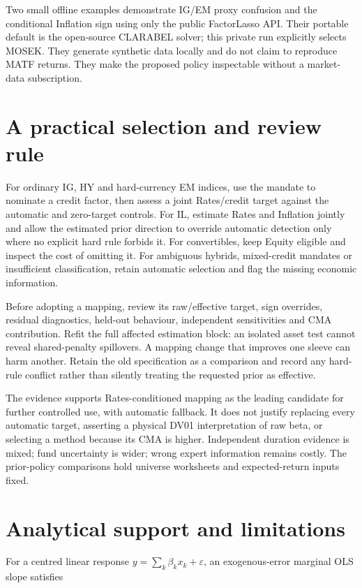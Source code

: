 \documentclass[a4paper,review]{cas-sc}
\begin{document}
Two small offline examples demonstrate IG/EM proxy confusion and the conditional Inflation sign using only the public FactorLasso API. Their portable default is the open-source CLARABEL solver; this private run explicitly selects MOSEK. They generate synthetic data locally and do not claim to reproduce MATF returns. They make the proposed policy inspectable without a market-data subscription.

\section{A practical selection and review rule}

For ordinary IG, HY and hard-currency EM indices, use the mandate to nominate a credit factor, then assess a joint Rates/credit target against the automatic and zero-target controls. For IL, estimate Rates and Inflation jointly and allow the estimated prior direction to override automatic detection only where no explicit hard rule forbids it. For convertibles, keep Equity eligible and inspect the cost of omitting it. For ambiguous hybrids, mixed-credit mandates or insufficient classification, retain automatic selection and flag the missing economic information.

Before adopting a mapping, review its raw/effective target, sign overrides, residual diagnostics, held-out behaviour, independent sensitivities and CMA contribution. Refit the full affected estimation block: an isolated asset test cannot reveal shared-penalty spillovers. A mapping change that improves one sleeve can harm another. Retain the old specification as a comparison and record any hard-rule conflict rather than silently treating the requested prior as effective.

The evidence supports Rates-conditioned mapping as the leading candidate for further controlled use, with automatic fallback. It does not justify replacing every automatic target, asserting a physical DV01 interpretation of raw beta, or selecting a method because its CMA is higher. Independent duration evidence is mixed; fund uncertainty is wider; wrong expert information remains costly. The prior-policy comparisons hold universe worksheets and expected-return inputs fixed.

\section{Analytical support and limitations}

For a centred linear response $y=\sum_k\beta_k x_k+\varepsilon$, an exogenous-error marginal OLS slope satisfies
\end{document}
